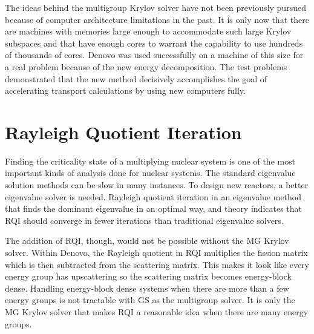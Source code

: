 

The ideas behind the multigroup Krylov solver have not been previously pursued because of computer architecture limitations in the past. It is only now that there are machines with memories large enough to accommodate such large Krylov subspaces and that have enough cores to warrant the capability to use hundreds of thousands of cores. Denovo was used successfully on a machine of this size for a real problem because of the new energy decomposition. The test problems demonstrated that the new method decisively accomplishes the goal of accelerating transport calculations by using new computers fully.

\section{Rayleigh Quotient Iteration}
Finding the criticality state of a multiplying nuclear system is one of the most important kinds of analysis done for nuclear systems. The standard eigenvalue solution methods can be slow in many instances. To design new reactors, a better eigenvalue solver is needed. Rayleigh quotient iteration in an eigenvalue method that finds the dominant eigenvalue in an optimal way, and theory indicates that RQI should converge in fewer iterations than traditional eigenvalue solvers.

The addition of RQI, though, would not be possible without the MG Krylov solver. Within Denovo, the Rayleigh quotient in RQI multiplies the fission matrix which is then subtracted from the scattering matrix. This makes it look like every energy group has upscattering so the scattering matrix becomes energy-block dense. Handling energy-block dense systems when there are more than a few energy groups is not tractable with GS as the multigroup solver. It is only the MG Krylov solver that makes RQI a reasonable idea when there are many energy groups.


